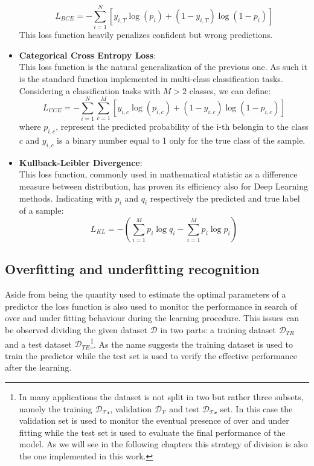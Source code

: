 \begin{itemize}
    \begin{equation}
        L_{BCE}= -\sum_{i=1}^N\left[ y_{i,T}\log(p_i)+
        \left(1- y_{i,T}\right)\log(1-p_i)\right]
    \end{equation}
    This loss function heavily penalizes confident but wrong predictions. 
\item \textbf{Categorical Cross Entropy Loss}:\\
    This loss function is the natural generalization of the previous one. As such it is the standard function implemented in multi-class classification tasks. Considering a classification tasks with $M>2$ classes, we can define: 
    \begin{equation}
        L_{CCE} = -\sum_{i=1}^N \sum_{c=1}^M  \left[
        y_{i,c}\log(p_{i,c}) + (1-y_{i,c})\log(1-p_{i,c})
        \right]
    \end{equation}
    where $p_{i,c}$, represent the predicted probability of the i-th belongin to the class $c$ and $y_{i,c}$ is a binary number equal to 1 only for the true class of the sample.
\item \textbf{Kullback-Leibler Divergence}:\\
   This loss function, commonly used in mathematical statistic as a difference measure between distribution, has proven its efficiency also for Deep Learning methods\cite{kullbackeff, kullbackeff2}. Indicating with $p_i$ and $q_i$ respectively the predicted and true label of a sample:
    \begin{equation}
        L_{KL} = - \left( \sum_{i=1}^{M} p_{i} \log{q_{i}} - \sum_{i=1}^{M} p_{i} \log{p_{i}} \right)
    \end{equation}
    
\end{itemize}


\subsection{Overfitting and underfitting recognition} \label{fit_over_under}

Aside from being the quantity used to estimate the optimal parameters of a predictor the loss function is also used to monitor the performance in search of over and under fitting behaviour during the learning procedure. 
This issues can be observed dividing the given dataset $\mathcal{D}$ in two parts: a training dataset $\mathcal{D}_{TR}$ and a test dataset $\mathcal{D}_{TE}$\footnote{In many applications the dataset is not split in two but rather three subsets, namely the training $\mathcal{D_{Tr}}$, validation $\mathcal{D_{V}}$ and test $\mathcal{D_{Te}}$ set. In this case the validation set is used to monitor the eventual presence of over and under fitting while the test set is used to evaluate the final performance of the model. As we will see in the following chapters this strategy of division is also the one implemented in this work.}. As the name suggests the training dataset is used to train the predictor while the test set is used to verify the effective performance after the learning.

